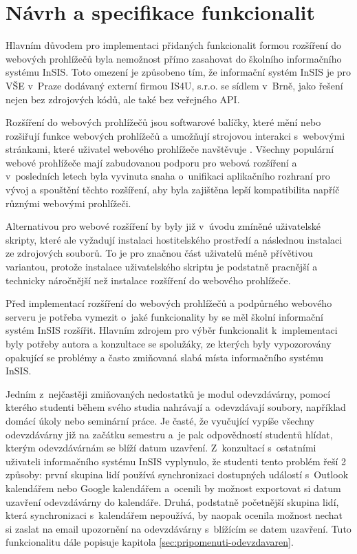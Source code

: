 \chapter{Návrh a specifikace funkcionalit}\label{chap:navrh-a-specifikace}

Hlavním důvodem pro implementaci přidaných funkcionalit formou rozšíření do webových prohlížečů byla nemožnost přímo zasahovat do školního informačního systému InSIS. Toto omezení je způsobeno tím, že informační systém InSIS je pro VŠE v~Praze dodávaný externí firmou IS4U, s.r.o. se sídlem v~Brně, jako řešení nejen bez zdrojových kódů, ale také bez veřejného API. 

Rozšíření do webových prohlížečů jsou softwarové balíčky, které mění nebo rozšiřují funkce webových prohlížečů a umožňují strojovou interakci s~webovými stránkami, které uživatel webového prohlížeče navštěvuje \cite{web_extensions_2019}. Všechny populární webové prohlížeče mají zabudovanou podporu pro webová rozšíření a v~posledních letech byla vyvinuta snaha o~unifikaci aplikačního rozhraní pro vývoj a spouštění těchto rozšíření, aby byla zajištěna lepší kompatibilita napříč různými webovými prohlížeči.  

Alternativou pro webové rozšíření by byly již v~úvodu zmíněné uživatelské skripty, které ale vyžadují instalaci hostitelského prostředí a následnou instalaci ze zdrojových souborů. To je pro značnou část uživatelů méně přívětivou variantou, protože instalace uživatelského skriptu je podstatně pracnější a technicky náročnější než instalace rozšíření do webového prohlížeče. 

Před implementací rozšíření do webových prohlížečů a podpůrného webového serveru je potřeba vymezit o~jaké funkcionality by se měl školní informační systém InSIS rozšířit. 
Hlavním zdrojem pro výběr funkcionalit k~implementaci byly potřeby autora a konzultace se spolužáky, ze kterých byly vypozorovány opakující se problémy a často zmiňovaná slabá místa informačního systému InSIS. 

Jedním z~nejčastěji zmiňovaných nedostatků je modul odevzdávárny, pomocí kterého studenti během svého studia nahrávají a~odevzdávají soubory, například domácí úkoly nebo seminární práce. Je časté, že vyučující vypíše všechny odevzdávárny již na začátku semestru a~je pak odpovědností studentů hlídat, kterým odevzdávárnám se blíží datum uzavření. Z~konzultací s~ostatními uživateli informačního systému InSIS vyplynulo, že studenti tento problém řeší 2 způsoby: první skupina lidí používá synchronizaci dostupných událostí s~Outlook kalendářem nebo Google kalendářem a~ocenili by možnost exportovat si datum uzavření odevzdávárny do kalendáře. Druhá, podstatně početnější skupina lidí, která synchronizaci s~kalendářem nepoužívá, by naopak ocenila možnost nechat si zaslat na email upozornění na odevzdávárny s~blížícím se datem uzavření. Tuto funkcionalitu dále popisuje kapitola \ref{sec:pripomenuti-odevzdavaren}.

